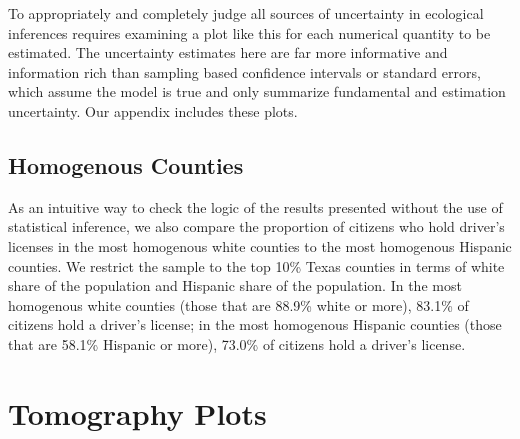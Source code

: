 \documentclass[12pt]{article}
\begin{document}
To appropriately and completely judge all sources of uncertainty in
ecological inferences requires examining a plot like this for each
numerical quantity to be estimated.  The uncertainty estimates here
are far more informative and information rich than sampling based
confidence intervals or standard errors, which assume the model is
true and only summarize fundamental and estimation uncertainty.  Our
appendix includes these plots.

\subsection{Homogenous Counties}

As an intuitive way to check the logic of the results presented without the use of statistical inference, we also compare the proportion of citizens who hold driver's licenses in the most homogenous white counties to the most homogenous Hispanic counties. We restrict the sample to the top 10\% Texas counties in terms of white share of the population and Hispanic share of the population. In the most homogenous white counties (those that are 88.9\% white or more), 83.1\% of citizens hold a driver's license; in the most homogenous Hispanic counties (those that are 58.1\% Hispanic or more), 73.0\% of citizens hold a driver's license.

\singlespace
 
\bibsep=0in 
{}



\appendix
\renewcommand*\appendixpagename{\section*{Appendix}}
\appendixpage

\section{Tomography Plots}
\end{document}
